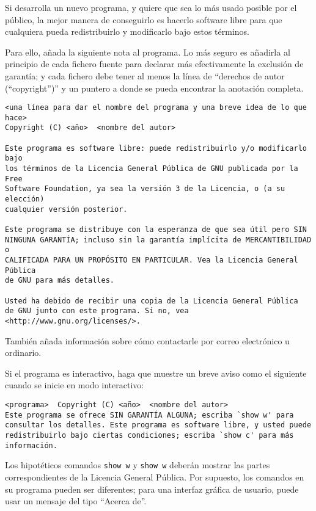 {\begin{enumerate}
Si desarrolla un nuevo programa, y quiere que sea lo m\'{a}s usado posible por
el p\'{u}blico, la mejor manera de conseguirlo es hacerlo software libre para que
cualquiera pueda redistribuirlo y modificarlo bajo estos t\'{e}rminos.

Para ello, a\~nada la siguiente nota al programa. Lo m\'{a}s seguro es a\~nadirla
al principio de cada fichero fuente para declarar m\'{a}s efectivamente la
exclusi\'{o}n de garant\'{i}a; y cada fichero debe tener al menos la l\'{i}nea de ``derechos de autor (``copyright'')''
y un puntero a donde se pueda encontrar la anotaci\'{o}n completa.

{\footnotesize
\begin{verbatim}
<una línea para dar el nombre del programa y una breve idea de lo que hace>
Copyright (C) <año>  <nombre del autor>
    
Este programa es software libre: puede redistribuirlo y/o modificarlo bajo
los términos de la Licencia General Pública de GNU publicada por la Free
Software Foundation, ya sea la versión 3 de la Licencia, o (a su elección)
cualquier versión posterior.
    
Este programa se distribuye con la esperanza de que sea útil pero SIN
NINGUNA GARANTÍA; incluso sin la garantía implícita de MERCANTIBILIDAD o
CALIFICADA PARA UN PROPÓSITO EN PARTICULAR. Vea la Licencia General Pública 
de GNU para más detalles.
    
Usted ha debido de recibir una copia de la Licencia General Pública 
de GNU junto con este programa. Si no, vea <http://www.gnu.org/licenses/>.
\end{verbatim}
}

Tambi\'{e}n a\~nada informaci\'{o}n sobre c\'{o}mo contactarle por correo electr\'{o}nico u
ordinario.

Si el programa es interactivo, haga que muestre un breve aviso como el 
siguiente cuando se inicie en modo interactivo:

{\footnotesize
\begin{verbatim}
<programa>  Copyright (C) <año>  <nombre del autor>
Este programa se ofrece SIN GARANTÍA ALGUNA; escriba `show w' para 
consultar los detalles. Este programa es software libre, y usted puede 
redistribuirlo bajo ciertas condiciones; escriba `show c' para más 
información.
\end{verbatim}
}

Los hipot\'{e}ticos comandos {\tt show w} y {\tt show w} deber\'{a}n mostrar las partes 
correspondientes de la Licencia General P\'{u}blica. Por supuesto, los comandos 
en su programa pueden ser diferentes; para una interfaz gr\'{a}fica de usuario, 
puede usar un mensaje del tipo ``Acerca de''.


\end{enumerate}}
